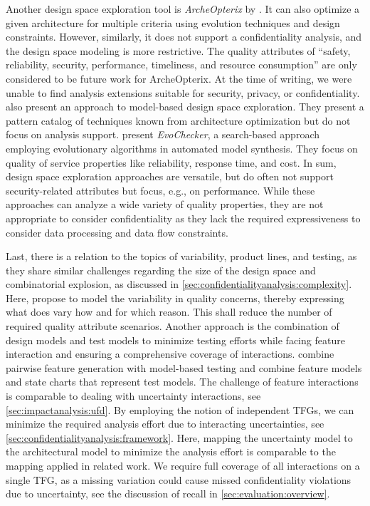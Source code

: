 Another design space exploration tool is \emph{ArcheOpterix} by \textcite{aleti_archeopterix_2009}. 
It can also optimize a given architecture for multiple criteria using evolution techniques and design constraints.
However, similarly, it does not support a confidentiality analysis, and the design space modeling is more restrictive.
The quality attributes of \enquote{safety, reliability, security, performance, timeliness, and resource consumption} \cite{aleti_archeopterix_2009} are only considered to be future work for ArcheOpterix.
At the time of writing, we were unable to find analysis extensions suitable for security, privacy, or confidentiality.
\textcite{vanherpen_design-space_2014} also present an approach to model-based design space exploration.
They present a pattern catalog of techniques known from architecture optimization but do not focus on analysis support.
\textcite{gerasimou_synthesis_2018} present \emph{EvoChecker}, a search-based approach employing evolutionary algorithms in automated model synthesis.
They focus on quality of service properties like reliability, response time, and cost.
In sum, design space exploration approaches are versatile, but do often not support security-related attributes but focus, e.g., on performance.
While these approaches can analyze a wide variety of quality properties, they are not appropriate to consider confidentiality as they lack the required expressiveness to consider data processing and data flow constraints.

Last, there is a relation to the topics of variability, product lines, and testing, as they share similar challenges regarding the size of the design space and combinatorial explosion, as discussed in \autoref{sec:confidentialityanalysis:complexity}.
Here, \textcite{abbas_modeling_2012} propose to model the variability in quality concerns, thereby expressing what does vary how and for which reason.
This shall reduce the number of required quality attribute scenarios.
Another approach is the combination of design models and test models to minimize testing efforts while facing feature interaction and ensuring a comprehensive coverage of interactions.
\textcite{oster_pairwise_2011} combine pairwise feature generation with model-based testing and \textcite{lochau_model-based_2012} combine feature models and state charts that represent test models.
The challenge of feature interactions is comparable to dealing with uncertainty interactions, see \autoref{sec:impactanalysis:ufd}.
By employing the notion of independent \acfp{TFG}, we can minimize the required analysis effort due to interacting uncertainties, see \autoref{sec:confidentialityanalysis:framework}.
Here, mapping the uncertainty model to the architectural model to minimize the analysis effort is comparable to the mapping applied in related work.
We require full coverage of all interactions on a single \ac{TFG}, as a missing variation could cause missed confidentiality violations due to uncertainty, see the discussion of recall in \autoref{sec:evaluation:overview}.



